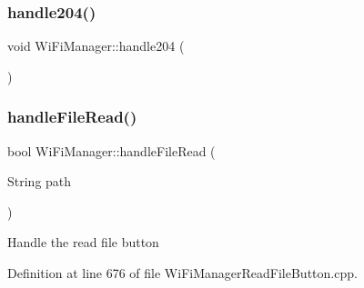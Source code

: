 \subsubsection{\texorpdfstring{handle204()}{handle204()}}
{\footnotesize\ttfamily void Wi\+Fi\+Manager\+::handle204 (\begin{DoxyParamCaption}{ }\end{DoxyParamCaption})\hspace{0.3cm}{\ttfamily [private]}}

\mbox{\label{class_wi_fi_manager_a9e802fa4ca834a622f058a7176f47806}} 
\subsubsection{\texorpdfstring{handle\+File\+Read()}{handleFileRead()}}
{\footnotesize\ttfamily bool Wi\+Fi\+Manager\+::handle\+File\+Read (\begin{DoxyParamCaption}\item[{String}]{path }\end{DoxyParamCaption})\hspace{0.3cm}{\ttfamily [private]}}

Handle the read file button 

Definition at line 676 of file Wi\+Fi\+Manager\+Read\+File\+Button.\+cpp.


